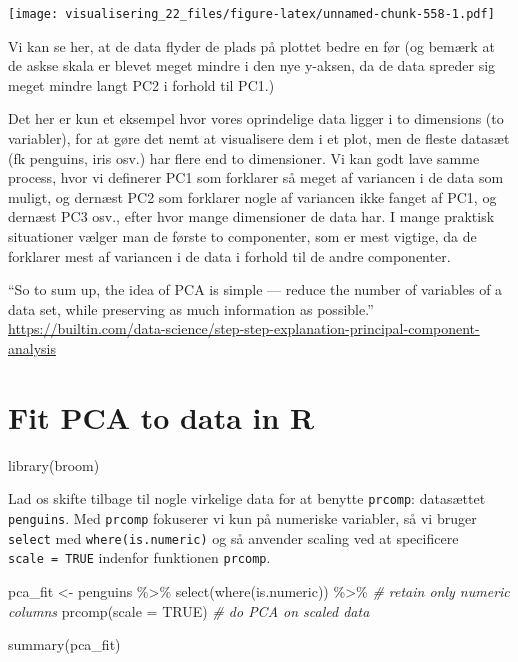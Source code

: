 \documentclass[
]{book}
\newenvironment{Shaded}{\begin{snugshade}}{\end{snugshade}}
\newcommand{\AttributeTok}[1]{\textcolor[rgb]{0.77,0.63,0.00}{#1}}
\newcommand{\CommentTok}[1]{\textcolor[rgb]{0.56,0.35,0.01}{\textit{#1}}}
\newcommand{\ConstantTok}[1]{\textcolor[rgb]{0.00,0.00,0.00}{#1}}
\newcommand{\FunctionTok}[1]{\textcolor[rgb]{0.00,0.00,0.00}{#1}}
\newcommand{\NormalTok}[1]{#1}
\newcommand{\OtherTok}[1]{\textcolor[rgb]{0.56,0.35,0.01}{#1}}
\newcommand{\SpecialCharTok}[1]{\textcolor[rgb]{0.00,0.00,0.00}{#1}}
\begin{document}
\texttt{[image: visualisering\_22\_files/figure-latex/unnamed-chunk-558-1.pdf]}

Vi kan se her, at de data flyder de plads på plottet bedre en før (og bemærk at de askse skala er blevet meget mindre i den nye y-aksen, da de data spreder sig meget mindre langt PC2 i forhold til PC1.)

Det her er kun et eksempel hvor vores oprindelige data ligger i to dimensions (to variabler), for at gøre det nemt at visualisere dem i et plot, men de fleste datasæt (fk penguins, iris osv.) har flere end to dimensioner. Vi kan godt lave samme process, hvor vi definerer PC1 som forklarer så meget af variancen i de data som muligt, og dernæst PC2 som forklarer nogle af variancen ikke fanget af PC1, og dernæst PC3 osv., efter hvor mange dimensioner de data har. I mange praktisk situationer vælger man de første to componenter, som er mest vigtige, da de forklarer mest af variancen i de data i forhold til de andre componenter.

``So to sum up, the idea of PCA is simple --- reduce the number of variables of a data set, while preserving as much information as possible.'' \url{https://builtin.com/data-science/step-step-explanation-principal-component-analysis}

\hypertarget{fit-pca-to-data-in-r}{%
\section{Fit PCA to data in R}\label{fit-pca-to-data-in-r}}

\begin{Shaded}
\begin{Highlighting}[]
\FunctionTok{library}\NormalTok{(broom)}
\end{Highlighting}
\end{Shaded}

Lad os skifte tilbage til nogle virkelige data for at benytte \texttt{prcomp}: datasættet \texttt{penguins}. Med \texttt{prcomp} fokuserer vi kun på numeriske variabler, så vi bruger \texttt{select} med \texttt{where(is.numeric)} og så anvender scaling ved at specificere \texttt{scale\ =\ TRUE} indenfor funktionen \texttt{prcomp}.

\begin{Shaded}
\begin{Highlighting}[]
\NormalTok{pca\_fit }\OtherTok{\textless{}{-}}\NormalTok{ penguins }\SpecialCharTok{\%\textgreater{}\%}
  \FunctionTok{select}\NormalTok{(}\FunctionTok{where}\NormalTok{(is.numeric)) }\SpecialCharTok{\%\textgreater{}\%} \CommentTok{\# retain only numeric columns}
  \FunctionTok{prcomp}\NormalTok{(}\AttributeTok{scale =} \ConstantTok{TRUE}\NormalTok{) }\CommentTok{\# do PCA on scaled data}

\FunctionTok{summary}\NormalTok{(pca\_fit)}
\end{Highlighting}
\end{Shaded}
\end{document}
